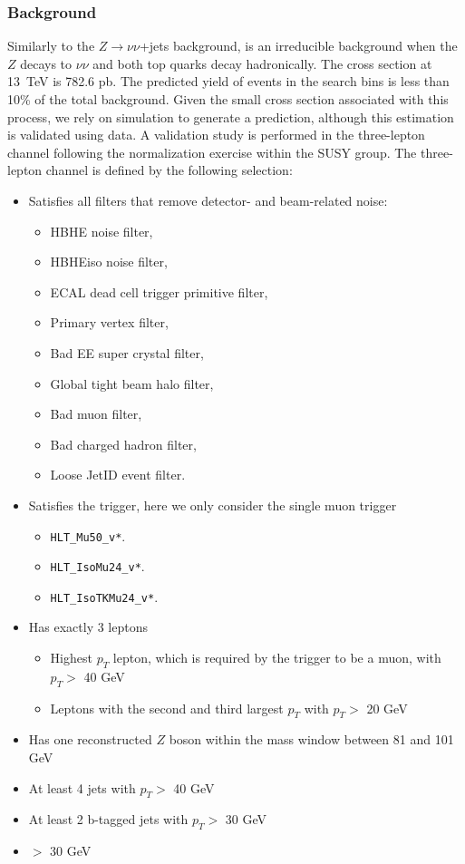 \subsubsection{\texorpdfstring{\ttbarZ Background}{\ttbarZ Background}}
\label{sss:ttZ}

Similarly to the $Z\rightarrow\nu\nu$+jets background, \ttbarZ is an
irreducible background when the $Z$ decays to $\nu \nu$ and both top quarks decay
hadronically.  The \ttbarZ cross section at 13~TeV is 782.6 pb. The predicted
yield of \ttbarZ events in the search bins is less than 10\% of the total
background. Given the small cross section associated with this process, we
rely on simulation to generate a prediction, although this estimation is
validated using data. A validation study is performed in the
three-lepton channel following the \ttbarZ normalization exercise within the
SUSY group. The three-lepton channel is defined by the following selection:

\begin{itemize}
  \item Satisfies all filters that remove detector- and beam-related noise: 
    \begin{itemize}
      \item HBHE noise filter, 
      \item HBHEiso noise filter, 
      \item ECAL dead cell trigger primitive filter,
      \item Primary vertex filter,
      \item Bad EE super crystal filter,
      \item Global tight beam halo filter,
      \item Bad muon filter,
      \item Bad charged hadron filter,
      \item Loose JetID event filter.
    \end{itemize}
  \item Satisfies the trigger, here we only consider the single muon trigger
    \begin{itemize}
      \item \texttt{HLT\_Mu50\_v*}.
      \item \texttt{HLT\_IsoMu24\_v*}.
      \item \texttt{HLT\_IsoTKMu24\_v*}.
    \end{itemize}
  \item Has exactly 3 leptons
    \begin{itemize}
			\item Highest $p_{T}$ lepton, which is required by the trigger to be a muon, with $p_{T}>$ 40 GeV
			\item Leptons with the second and third largest $p_{T}$ with $p_{T}>$ 20 GeV
    \end{itemize}
  \item Has one reconstructed $Z$ boson within the mass window between 81 and 101 GeV
	\item At least 4 jets with $p_{T}>$ 40 GeV
	\item At least 2 b-tagged jets with $p_{T}>$ 30 GeV
  \item \MET $>$ 30 GeV
\end{itemize}

